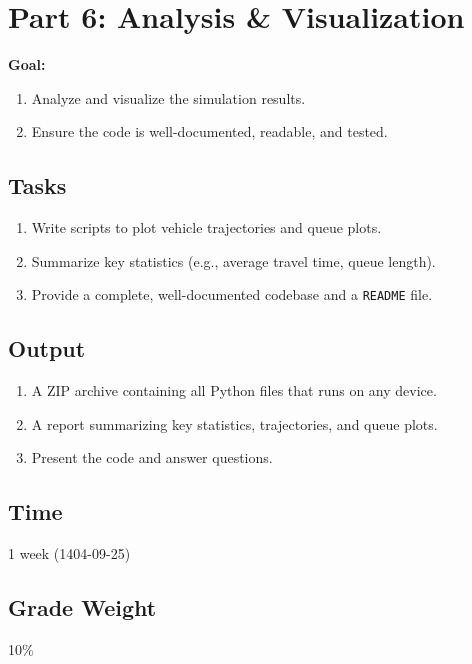 \documentclass{KPS_assignment}
\begin{document}
\maketitle
\section*{Part 6: Analysis \& Visualization}

\textbf{Goal:}
\begin{enumerate}
\item Analyze and visualize the simulation results.
\item Ensure the code is well-documented, readable, and tested.
\end{enumerate}

\subsection*{Tasks}
\begin{enumerate}
    \item Write scripts to plot vehicle trajectories and queue plots.
    \item Summarize key statistics (e.g., average travel time, queue length).
    \item Provide a complete, well-documented codebase and a \texttt{README} file.
\end{enumerate}

\subsection*{Output}
\begin{enumerate}
\item A ZIP archive containing all Python files that runs on any device.
\item A report summarizing key statistics, trajectories, and queue plots.
\item Present the code and answer questions.
\end{enumerate}

\subsection*{Time}
1 week (1404-09-25)

\subsection*{Grade Weight}
10\%
\end{document}
